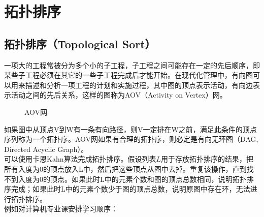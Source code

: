 \newpage

\section{拓扑排序}

\subsection{拓扑排序（Topological Sort）}

一项大的工程常被分为多个小的子工程，子工程之间可能存在一定的先后顺序，即某些子工程必须在其它的一些子工程完成后才能开始。在现代化管理中，有向图可以用来描述和分析一项工程的计划和实施过程，其中图的顶点表示活动，有向边表示活动之间的先后关系，这样的图称为AOV（Activity on Vertex）网。

\begin{figure}[H]
	\centering
	\caption{AOV网}
\end{figure}

如果图中从顶点V到W有一条有向路径，则V一定排在W之前，满足此条件的顶点序列称为一个拓扑序。AOV网如果有合理的拓扑序，则必定是有向无环图（DAG, Directed Acyclic Graph）。\\

可以使用卡恩Kahn算法完成拓扑排序。假设列表$ L $用于存放拓扑排序的结果，把所有入度为0的顶点放入L中，然后把这些顶点从图中去掉。重复该操作，直到找不到入度为0的顶点。如果此时L中的元素个数和图的顶点总数相同，说明拓扑排序完成；如果此时L中的元素个数少于图的顶点总数，说明原图中存在环，无法进行拓扑排序。\\

例如对计算机专业课安排学习顺序：

